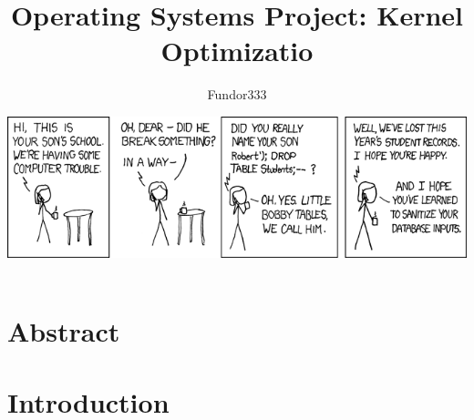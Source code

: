 \documentclass[a4paper]{article}
\title{Operating Systems Project: Kernel Optimizatio}
\author{\normalsize Fundor333 }
\date{\includegraphics[scale=0.4]{mom}}
\begin{document}
 

\maketitle


\section{Abstract}

\lipsum[1-4]\autocite{tanenbaum2013fondamenti}

\section{Introduction}

\lipsum[5-9]

\printbibliography
\end{document}
